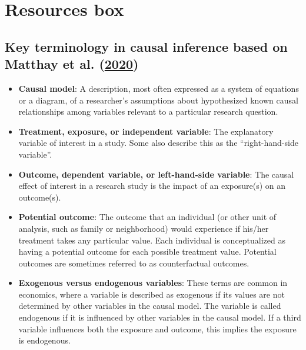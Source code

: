 \documentclass[
]{book}
\providecommand{\tightlist}{%
  \setlength{\itemsep}{0pt}\setlength{\parskip}{0pt}}
\begin{document}
\hypertarget{resources-box-2}{%
\section{Resources box}\label{resources-box-2}}

\hypertarget{key-terminology-in-causal-inference-based-on-matthay_alternative_2020}{%
\subsection{\texorpdfstring{Key terminology in causal inference based on
Matthay et al.
(\protect\hyperlink{ref-matthay_alternative_2020}{2020})}{Key terminology in causal inference based on Matthay et al. (2020)}}\label{key-terminology-in-causal-inference-based-on-matthay_alternative_2020}}

\begin{itemize}
\tightlist
\item
  \textbf{Causal model}: A description, most often expressed as a system
  of equations or a diagram, of a researcher's assumptions about
  hypothesized known causal relationships among variables relevant to a
  particular research question.
\item
  \textbf{Treatment, exposure, or independent variable}: The explanatory
  variable of interest in a study. Some also describe this as the
  ``right-hand-side variable''.
\item
  \textbf{Outcome, dependent variable, or left-hand-side variable}: The
  causal effect of interest in a research study is the impact of an
  exposure(s) on an outcome(s).
\item
  \textbf{Potential outcome}: The outcome that an individual (or other
  unit of analysis, such as family or neighborhood) would experience if
  his/her treatment takes any particular value. Each individual is
  conceptualized as having a potential outcome for each possible
  treatment value. Potential outcomes are sometimes referred to as
  counterfactual outcomes.
\item
  \textbf{Exogenous versus endogenous variables}: These terms are common
  in economics, where a variable is described as exogenous if its values
  are not determined by other variables in the causal model. The
  variable is called endogenous if it is influenced by other variables
  in the causal model. If a third variable influences both the exposure
  and outcome, this implies the exposure is endogenous.
\end{itemize}
\end{document}
